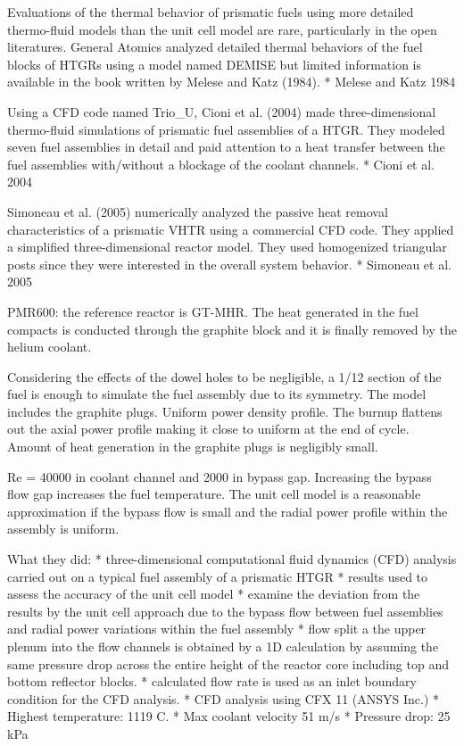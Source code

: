 Evaluations of the thermal behavior of prismatic fuels using more detailed thermo-fluid models than the unit cell model are rare, particularly in the open literatures.
General Atomics analyzed detailed thermal behaviors of the fuel blocks of HTGRs using a model named DEMISE but limited information is available in the book written by Melese and Katz (1984).
* Melese and Katz 1984

Using a CFD code named Trio_U, Cioni et al. (2004) made three-dimensional thermo-fluid simulations of prismatic fuel assemblies of a HTGR.
They modeled seven fuel assemblies in detail and paid attention to a heat transfer between the fuel assemblies with/without a blockage of the coolant channels.
* Cioni et al. 2004

Simoneau et al. (2005) numerically analyzed the passive heat removal characteristics of a prismatic VHTR using a commercial CFD code.
They applied a simplified three-dimensional reactor model.
They used homogenized triangular posts since they were interested in the overall system behavior.
* Simoneau et al. 2005

PMR600: the reference reactor is GT-MHR.
The heat generated in the fuel compacts is conducted through the graphite block and it is finally removed by the helium coolant.

Considering the effects of the dowel holes to be negligible, a 1/12 section of the fuel is enough to simulate the fuel assembly due to its symmetry.
The model includes the graphite plugs.
Uniform power density profile.
The burnup flattens out the axial power profile making it close to uniform at the end of cycle.
Amount of heat generation in the graphite plugs is negligibly small.

Re = 40000 in coolant channel and 2000 in bypass gap.
Increasing the bypass flow gap increases the fuel temperature.
The unit cell model is a reasonable approximation if the bypass flow is small and the radial power profile within the assembly is uniform.

What they did:
* three-dimensional computational fluid dynamics (CFD) analysis carried out on a typical fuel assembly of a prismatic HTGR
* results used to assess the accuracy of the unit cell model
* examine the deviation from the results by the unit cell approach due to the bypass flow between fuel assemblies and radial power variations within the fuel assembly
* flow split a the upper plenum into the flow channels is obtained by a 1D calculation by assuming the same pressure drop across the entire height of the reactor core including top and bottom reflector blocks.
* calculated flow rate is used as an inlet boundary condition for the CFD analysis.
* CFD analysis using CFX 11 (ANSYS Inc.)
* Highest temperature: 1119 C.
* Max coolant velocity 51 m/s
* Pressure drop: 25 kPa

